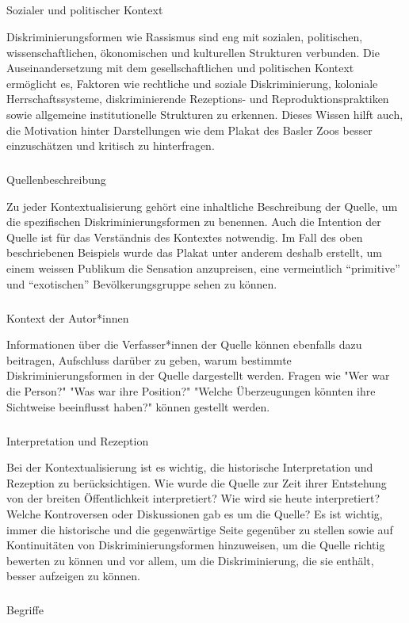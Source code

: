 \documentclass[
  nswissgerman,
  letterpaper,
  DIV=11,
  numbers=noendperiod]{scrartcl}
\makeatletter
\let\oldsubparagraph\subparagraph
\renewcommand{\subparagraph}{
    \@ifstar
      \xxxSubParagraphStar
      \xxxSubParagraphNoStar
  }
\newcommand{\xxxSubParagraphStar}[1]{\oldsubparagraph*{#1}\mbox{}}
\newcommand{\xxxSubParagraphNoStar}[1]{\oldsubparagraph{#1}\mbox{}}
\makeatother
\begin{document}
\subparagraph{Sozialer und politischer
Kontext}\label{sozialer-und-politischer-kontext}

Diskriminierungsformen wie Rassismus sind eng mit sozialen, politischen,
wissenschaftlichen, ökonomischen und kulturellen Strukturen verbunden.
Die Auseinandersetzung mit dem gesellschaftlichen und politischen
Kontext ermöglicht es, Faktoren wie rechtliche und soziale
Diskriminierung, koloniale Herrschaftssysteme, diskriminierende
Rezeptions- und Reproduktionspraktiken sowie allgemeine institutionelle
Strukturen zu erkennen. Dieses Wissen hilft auch, die Motivation hinter
Darstellungen wie dem Plakat des Basler Zoos besser einzuschätzen und
kritisch zu hinterfragen.

\subparagraph{Quellenbeschreibung}\label{quellenbeschreibung}

Zu jeder Kontextualisierung gehört eine inhaltliche Beschreibung der
Quelle, um die spezifischen Diskriminierungsformen zu benennen. Auch die
Intention der Quelle ist für das Verständnis des Kontextes notwendig. Im
Fall des oben beschriebenen Beispiels wurde das Plakat unter anderem
deshalb erstellt, um einem weissen Publikum die Sensation anzupreisen,
eine vermeintlich ``primitive'' und ``exotischen'' Bevölkerungsgruppe
sehen zu können.

\subparagraph{Kontext der Autor*innen}\label{kontext-der-autorinnen}

Informationen über die Verfasser*innen der Quelle können ebenfalls dazu
beitragen, Aufschluss darüber zu geben, warum bestimmte
Diskriminierungsformen in der Quelle dargestellt werden. Fragen wie "Wer
war die Person?" "Was war ihre Position?" "Welche Überzeugungen könnten
ihre Sichtweise beeinflusst haben?" können gestellt werden.

\subparagraph{Interpretation und
Rezeption}\label{interpretation-und-rezeption}

Bei der Kontextualisierung ist es wichtig, die historische
Interpretation und Rezeption zu berücksichtigen. Wie wurde die Quelle
zur Zeit ihrer Entstehung von der breiten Öffentlichkeit interpretiert?
Wie wird sie heute interpretiert? Welche Kontroversen oder Diskussionen
gab es um die Quelle? Es ist wichtig, immer die historische und die
gegenwärtige Seite gegenüber zu stellen sowie auf Kontinuitäten von
Diskriminierungsformen hinzuweisen, um die Quelle richtig bewerten zu
können und vor allem, um die Diskriminierung, die sie enthält, besser
aufzeigen zu können.

\subparagraph{Begriffe}\label{begriffe}
\end{document}

